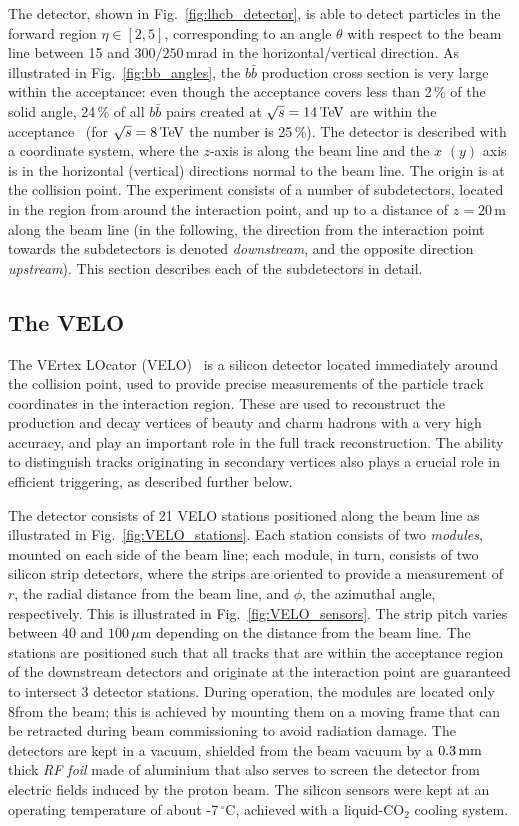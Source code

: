 The \lhcb detector, shown in Fig.~\ref{fig:lhcb_detector},  is able to detect particles in the forward region $\eta\in[2, 5]$, corresponding to an angle $\theta$ with respect to the beam line between 15 and $300/250$\,mrad in the horizontal/vertical direction. As illustrated in Fig.~\ref{fig:bb_angles}, the $b\bar b$ production cross section is very large within the \lhcb acceptance: even though the acceptance covers less than 2\,\% of the solid angle,  24\,\% of all $b\bar b$ pairs created at $\sqrt{s}=14\text{\,Te\kern -0.1em V}$ are within the acceptance~\cite{bbangles} (for $\sqrt{s}=8\text{\,Te\kern -0.1em V}$ the number is 25\,\%). The detector is described with a coordinate system, where the $z$-axis is along the beam line and the $x$ $(y)$ axis is in the horizontal (vertical) directions normal to the beam line. The origin is at the collision point. The experiment consists of a number of subdetectors, located in the region from around the interaction point, and up to a distance of $z=20\,$m along the beam line (in the following, the direction from the interaction point towards the subdetectors is denoted \emph{downstream}, and the opposite direction \emph{upstream}). This section describes each of the subdetectors in detail.
 
\subsection{The VELO} %
\label{sub:the_velo}
The VErtex LOcator (VELO)~\cite{VELO-TDR} is a silicon detector located immediately around the collision point, used to provide precise measurements of the particle track coordinates in the interaction region. These are used to reconstruct the production and decay vertices of beauty and charm hadrons with a very high accuracy,  and play an important role in the full track reconstruction. The ability to distinguish tracks originating in secondary vertices also plays a crucial role in efficient triggering, as described further below.

The detector consists of 21 VELO stations positioned along the beam line as illustrated in Fig.~\ref{fig:VELO_stations}. Each station consists of two \emph{modules}, mounted on each side of the beam line; each module, in turn, consists of two silicon strip detectors,  where the strips are oriented to provide a measurement of $r$, the radial distance from the beam line, and  $\phi$, the azimuthal angle, respectively. This is illustrated in Fig.~\ref{fig:VELO_sensors}. The strip pitch varies between 40 and $100\,\mu$m depending on the distance from the beam line.  The stations are positioned such that all tracks that are within the acceptance region of the downstream detectors and originate at the interaction point are guaranteed to intersect 3 detector stations. During operation, the modules are located only 8\mm from the beam; this is achieved by mounting them on a moving frame that can be retracted during beam commissioning to avoid radiation damage. The detectors are kept in a vacuum, shielded from the beam vacuum by a $0.3\text{\,mm}$ thick \emph{RF foil} made of aluminium that also serves to screen the detector from electric fields induced by the proton beam. The silicon sensors were kept at an operating temperature of about -7\,$^\circ$C, achieved with a liquid-CO$_2$ cooling system.

